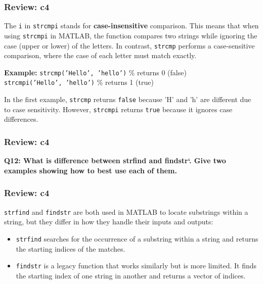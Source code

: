 \documentclass[
	11pt, %
]{beamer}
\begin{document}

\begin{frame}
    \frametitle{Review: c4}

    The \texttt{i} in \texttt{strcmpi} stands for \textbf{case-insensitive} comparison. This means that when using \texttt{strcmpi} in MATLAB, the function compares two strings while ignoring the case (upper or lower) of the letters. In contrast, \texttt{strcmp} performs a case-sensitive comparison, where the case of each letter must match exactly.

\vspace{0.5cm}

    \textbf{Example:}
    \texttt{strcmp('Hello', 'hello')}     \% returns 0 (false) \\
    \hspace{1.75cm} \texttt{strcmpi('Hello', 'hello')}    \% returns 1 (true) \\

\vspace{0.5cm}

    In the first example, \texttt{strcmp} returns \texttt{false} because 'H' and 'h' are different due to case sensitivity. However, \texttt{strcmpi} returns \texttt{true} because it ignores case differences.

\end{frame}


\begin{frame}
	\frametitle{Review: c4}

	\textbf{Q12: What is difference between strfind and findstr`. Give two examples showing how to best use each of them.}

\end{frame}


\begin{frame}
	\frametitle{Review: c4}


    \texttt{strfind} and \texttt{findstr} are both used in MATLAB to locate substrings within a string, but they differ in how they handle their inputs and outputs:

    \begin{itemize}
        \item \texttt{strfind} searches for the occurrence of a substring within a string and returns the starting indices of the matches.
        \item \texttt{findstr} is a legacy function that works similarly but is more limited. It finds the starting index of one string in another and returns a vector of indices.
    \end{itemize}

\end{frame}
\end{document}
